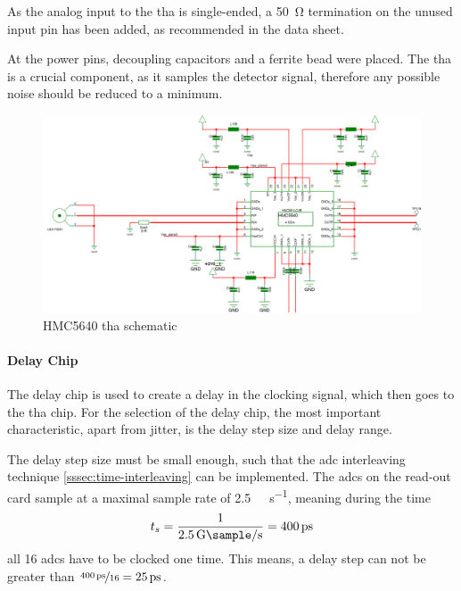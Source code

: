 As the analog input to the \gls{tha} is single-ended, a \SI{50}{\ohm} termination on the unused input pin has been added, as recommended in the data sheet.\cite{hmc5640}

At the power pins, decoupling capacitors and a ferrite bead  were placed. The \gls{tha} is a crucial component, as it samples the detector signal, therefore any possible noise should be reduced to a minimum.

\begin{figure}[tbh]
	\centering
	\includegraphics[width = \textwidth]{chap/04-work/img/hmc5640}
	\caption[HMC5640 THA schematic]{HMC5640 \gls{tha} schematic}
	\label{fig:hmc5640}
\end{figure}


\paragraph{Delay Chip}
The delay chip is used to create a delay in the clocking signal, which then goes to the \gls{tha} chip. For the selection of the delay chip, the most important characteristic, apart from jitter, is the delay step size and delay range. 

The delay step size must be small enough, such that the \gls{adc} interleaving technique \autoref{sssec:time-interleaving} can be implemented.
The \glspl{adc} on the read-out card sample at a maximal sample rate of \SI{2.5}{\giga \sample \per \second}, meaning during the time
\begin{equation}
	t_s = \frac{1}{\SI{2.5}{\giga \sample \per \second}} = \SI{400}{\pico \second}
\end{equation}
all 16 \glspl{adc} have to be clocked one time.
This means, a delay step can not be greater than $\nicefrac{\SI{400}{\pico\second}}{16} = \SI{25}{\pico\second}$.

